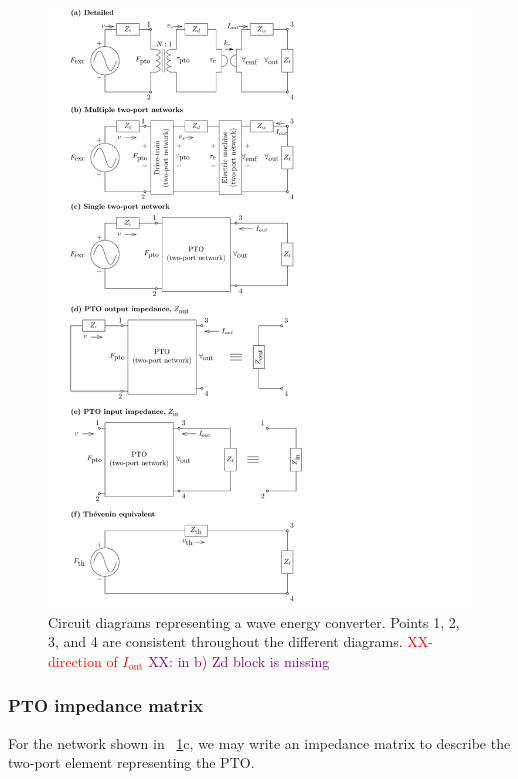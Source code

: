 \documentclass[lettersize,journal]{IEEEtran}
\newcommand{\rc}[1]{\textcolor{red}{#1}}
\newcommand{\dg}[1]{\textcolor{purple}{#1}}
\begin{document}
\begin{figure}[tb]
        \centering
        \includegraphics[width=1\columnwidth]{wec_as_multiport_circuits.pdf}
        \caption{Circuit diagrams representing a wave energy converter. Points 1, 2, 3, and 4 are consistent throughout the different diagrams. \rc{XX-direction of $I_{\textrm{out}}$} \dg{XX: in b) Zd block is missing}}
        \label{fig:wec_as_multiport_circuits}
\end{figure}

\subsubsection{PTO impedance matrix}\label{sec:pto_impedance_matrix}

For the network shown in \figurename~\ref{fig:wec_as_multiport_circuits}c, we may write an impedance matrix to describe the two-port element representing the PTO.
\end{document}
